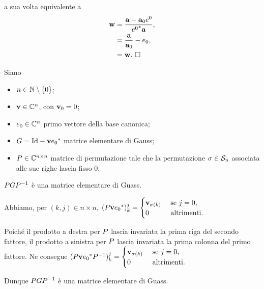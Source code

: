 a sua volta equivalente a
\begin{align*}
  \mathbf{w}
  &= \frac{\mathbf{a} - \mathbf{a}_0 e^0}
    {{e^0}^*\mathbf{a}},\\
  &= \frac{\mathbf{a}}{\mathbf{a}_0} - e_0,\\
  &= \mathbf{w}.\text{ $\square$}
\end{align*}
\begin{Theorem}
  Siano
  \begin{itemize}
    \item $n \in \mathbb{N} \setminus \lbrace 0 \rbrace$;
    \item $\mathbf{v} \in \mathbb{C}^n$, con $\mathbf{v}_0 = 0$;
    \item $e_0 \in \mathbb{C}^n$ primo vettore della base canonica;
    \item $\GaussElementaryMatrix = \Identity - \Vector\HermitianTransposed{\CanonicalBase_0}$
      matrice elementare di Gauss;
    \item $P \in \mathbb{C}^{n \times n}$ matrice di permutazione tale che
      la permutazione $\Permutation \in \SymmetricGroup{n}$ associata alle sue righe lascia
      fisso $0$.
  \end{itemize}
  $PGP^{-1}$
  \`e una matrice elementare di Guass.
\end{Theorem}
\Proof Abbiamo, per $(k,j) \in n \times n$,
$(\PermutationMatrix\Vector\HermitianTransposed{\CanonicalBase_0})_k^j
= \begin{cases}
  \Vector_{\Permutation(k)}&\text{ se }j = 0,\\
  0&\text{ altrimenti}.
\end{cases}$
\par Poich\'e il prodotto a destra per $P$ lascia
invariata la prima riga del secondo fattore, il prodotto a sinistra
per $P$ lascia invariata la prima colonna del primo fattore.
Ne consegue
$(\PermutationMatrix\Vector\HermitianTransposed{\CanonicalBase_0}\PermutationMatrix^{-1})_k^j
= \begin{cases}
  \Vector_{\Permutation(k)}&\text{ se }j = 0,\\
  0&\text{ altrimenti}.
\end{cases}$
\par Dunque
$PGP^{-1}$
\`e una matrice elementare di Guass. \EndProof

